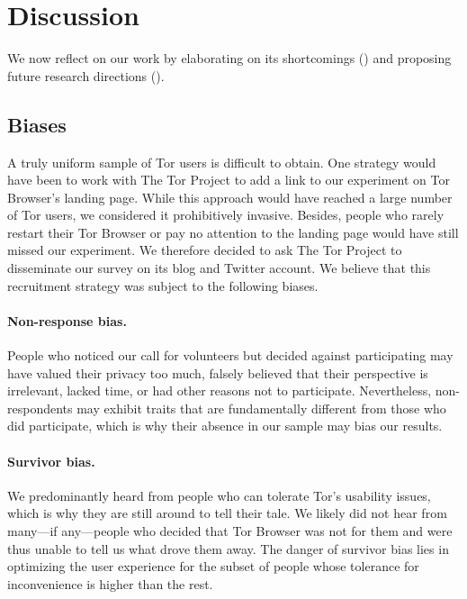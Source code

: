 \section{Discussion}
\label{sec:discussion}

We now reflect on our work by elaborating on its shortcomings
() and proposing future research directions
().

\subsection{Biases}
\label{sec:biases}

A truly uniform sample of Tor users is difficult to obtain.  One strategy would
have been to work with The Tor Project to add a link to our experiment on Tor
Browser's landing page.  While this approach would have reached a large number
of Tor users, we considered it prohibitively invasive.  Besides, people who
rarely restart their Tor Browser or pay no attention to the landing page would
have still missed our experiment.  We therefore decided to ask The Tor Project
to disseminate our survey on its blog and Twitter account.  We believe that this
recruitment strategy was subject to the following biases.

\paragraph{Non-response bias.}
People who noticed our call for volunteers but decided against participating may
have valued their privacy too much, falsely believed that their perspective is
irrelevant, lacked time, or had other reasons not to participate.  Nevertheless,
non-respondents may exhibit traits that are fundamentally different from those
who did participate, which is why their absence in our sample may bias our
results.

\paragraph{Survivor bias.}
We predominantly heard from people who can tolerate Tor's usability issues,
which is why they are still around to tell their tale.  We likely did not hear
from many---if any---people who decided that Tor Browser was not for them and
were thus unable to tell us what drove them away.  The danger of survivor bias
lies in optimizing the user experience for the subset of people whose tolerance
for inconvenience is higher than the rest.

